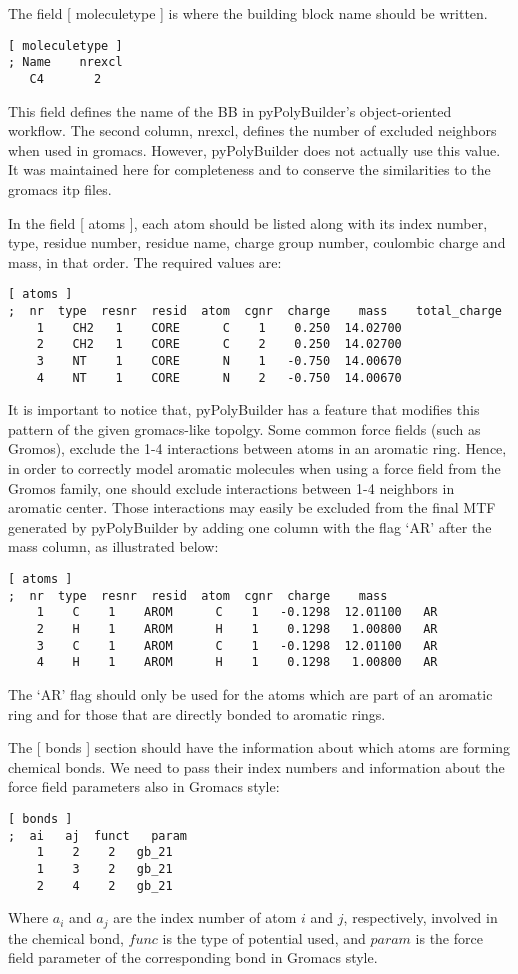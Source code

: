 \documentclass[12pt]{article}
\begin{document}
The field [ moleculetype ] is where the building block name should be written.
\begin{lstlisting}
[ moleculetype ]
; Name    nrexcl
   C4       2
\end{lstlisting}
This field defines the name of the BB in pyPolyBuilder's object-oriented workflow.
The second column, nrexcl, defines the number of excluded neighbors when used in gromacs. 
However, pyPolyBuilder does not actually use this value. It was maintained here for completeness and to conserve the similarities to the gromacs itp files.

In the field [ atoms ], each atom should be listed along with its index number, type, residue number, residue name, charge group number, coulombic charge and mass, in that order. The required values are:

\begin{lstlisting}
[ atoms ]
;  nr  type  resnr  resid  atom  cgnr  charge    mass    total_charge
    1    CH2   1    CORE      C    1    0.250  14.02700
    2    CH2   1    CORE      C    2    0.250  14.02700
    3    NT    1    CORE      N    1   -0.750  14.00670
    4    NT    1    CORE      N    2   -0.750  14.00670
\end{lstlisting}

It is important to notice that, pyPolyBuilder has a feature that modifies this pattern of the given gromacs-like topolgy.
Some common force fields (such as Gromos), exclude the 1-4 interactions between atoms in an aromatic ring.
Hence, in order to correctly model aromatic molecules when using a force field from the Gromos family, one should exclude interactions between 1-4 neighbors in aromatic center.
Those interactions may easily be excluded from the final MTF generated by pyPolyBuilder by adding one column with the flag `AR' after the mass column, as illustrated below:

\begin{lstlisting}
[ atoms ]
;  nr  type  resnr  resid  atom  cgnr  charge    mass    
    1    C    1    AROM      C    1   -0.1298  12.01100   AR
    2    H    1    AROM      H    1    0.1298   1.00800   AR
    3    C    1    AROM      C    1   -0.1298  12.01100   AR
    4    H    1    AROM      H    1    0.1298   1.00800   AR
\end{lstlisting}

The `AR' flag should only be used for the atoms which are part of an aromatic ring and for those that are directly bonded to aromatic rings.

The [ bonds ] section should have the information about which atoms are forming
chemical bonds. We need to pass their index numbers and information about
the force field parameters also in Gromacs style:
\begin{lstlisting}
[ bonds ]
;  ai   aj  funct   param
    1    2    2   gb_21
    1    3    2   gb_21
    2    4    2   gb_21
\end{lstlisting}
Where $a_i$ and $a_j$ are the index number of atom $i$ and $j$, respectively, involved in the chemical bond, $func$ is the type of potential used, and $param$ is the force field parameter of the corresponding bond in Gromacs style.
\end{document}
